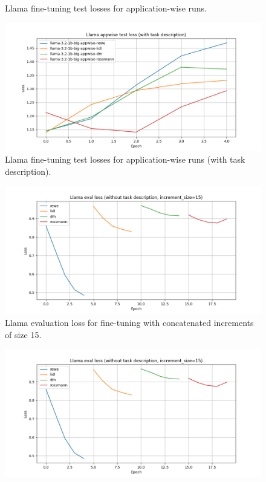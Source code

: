 \documentclass[licencjacka,en]{pracamgr}
\begin{document}
\begin{appendices}
\begin{figure}[h]
    \caption{Llama fine-tuning test losses for application-wise runs.}
    \label{fig:llama-wth-appwise}
\end{figure}
\begin{figure}[h]
    \centering
    \includegraphics[width=0.8\linewidth]{bachelor_images/llama_ft/llama-appwise-w-test.png}
    \caption{Llama fine-tuning test losses for application-wise runs (with task description).}
    \label{fig:llama-w-appwise}
\end{figure}
\begin{figure}[h]
    \centering
    \includegraphics[width=0.8\linewidth]{bachelor_images/llama_ft/llama-inc-15-tot-eval.png}
    \caption{Llama evaluation loss for fine-tuning with concatenated increments of size 15.}
    \label{fig:llama-inc-tot-15-eval}
\end{figure}
\begin{figure}[h]
    \centering
    \includegraphics[width=0.8\linewidth]{bachelor_images/llama_ft/llama-inc-15-tot-eval.png}

\end{figure}
\end{appendices}
\end{document}
